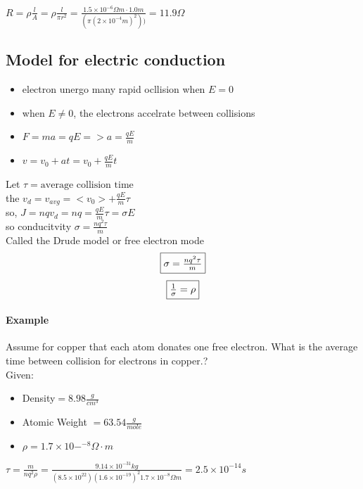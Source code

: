 \documentclass{article}
\begin{document}
    \paragraph{}$R = \rho \frac{l}{A} = \rho \frac{l}{\pi r^2} = \frac{1.5 \times 10^{-6}\Omega m \cdot 1.0 m}{(\pi (2\times 10^{-4}m)^2))} = 11.9 \Omega$    
   
    \subsection{Model for electric conduction}
    \begin{itemize}
        \item electron unergo many rapid ocllision when  $E = 0$
        \item when $E \neq 0$, the electrons accelrate between collisions
        \item $F = ma = qE => a = \frac{qE}{m}$
        \item $v = v_0 + at= v_0 + \frac{qE}{m}t $
    \end{itemize}
    Let $\tau = \text{average collision time}$\\
    the  $v_d = v_{avg} = <v_0> + \frac{qE}{m}\tau$\\
    so, $J = nqv_d = nq = \frac{qE}{m}\tau = \sigma E$\\
    so conducitvity $\sigma = \frac{nq^2\tau}{m}$\\
    Called the Drude model or free electron mode\\
    $$\boxed{$$\sigma = \frac{nq^2 \tau}{m}$$}$$
    $$\boxed{$$\frac{1}{\sigma} = \rho$$}$$
    \paragraph{Example} Assume for copper that each atom donates one free electron. What is the average time between collision for electrons in copper.?
    \\Given: 
    \begin{itemize}
        \item Density$ = 8.98\frac{g}{cm^3}$
        \item Atomic Weight $ = 63.54\frac{g}{mole}$
        \item $\rho = 1.7 \times 10-^{-8}\Omega\cdot m$
    \end{itemize}
    $\tau = \frac{m}{nq^2\rho}=\frac{9.14 \times 10^{-31}kg}{(8.5\times10^22 ) (1.6\times10^{-19})^2 1.7\times10^{-8}\Omega m} = 2.5\times10^{-14}s$
\end{document}
